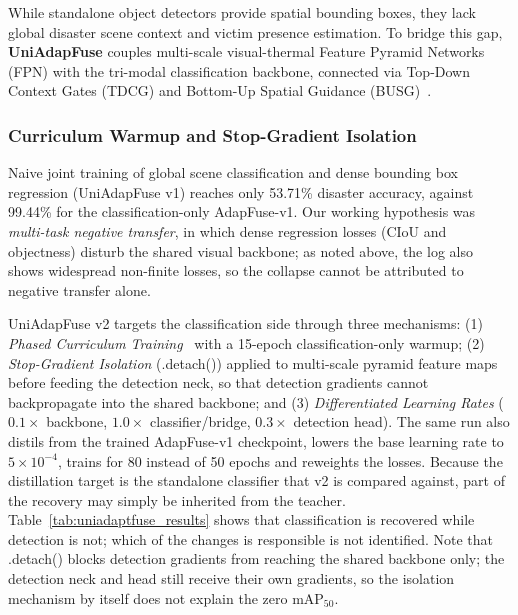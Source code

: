 \documentclass[journal]{IEEEtran}
\begin{document}
While standalone object detectors provide spatial bounding boxes, they lack global disaster scene context and victim presence estimation. To bridge this gap, \textbf{UniAdapFuse} couples multi-scale visual-thermal Feature Pyramid Networks (FPN) with the tri-modal classification backbone, connected via Top-Down Context Gates (TDCG) and Bottom-Up Spatial Guidance (BUSG)~\cite{perez2018film}.

\subsubsection{Curriculum Warmup and Stop-Gradient Isolation}

Naive joint training of global scene classification and dense bounding box regression (UniAdapFuse v1) reaches only 53.71\% disaster accuracy, against 99.44\% for the classification-only AdapFuse-v1. Our working hypothesis was \textit{multi-task negative transfer}, in which dense regression losses (CIoU and objectness) disturb the shared visual backbone; as noted above, the log also shows widespread non-finite losses, so the collapse cannot be attributed to negative transfer alone.

UniAdapFuse v2 targets the classification side through three mechanisms: (1) \textit{Phased Curriculum Training}~\cite{bengio2009curriculum} with a 15-epoch classification-only warmup; (2) \textit{Stop-Gradient Isolation} (.detach()) applied to multi-scale pyramid feature maps before feeding the detection neck, so that detection gradients cannot backpropagate into the shared backbone; and (3) \textit{Differentiated Learning Rates} ($0.1\times$ backbone, $1.0\times$ classifier/bridge, $0.3\times$ detection head). The same run also distils from the trained AdapFuse-v1 checkpoint, lowers the base learning rate to $5\times10^{-4}$, trains for 80 instead of 50 epochs and reweights the losses. Because the distillation target is the standalone classifier that v2 is compared against, part of the recovery may simply be inherited from the teacher. Table~\ref{tab:uniadaptfuse_results} shows that classification is recovered while detection is not; which of the changes is responsible is not identified. Note that .detach() blocks detection gradients from reaching the shared backbone only; the detection neck and head still receive their own gradients, so the isolation mechanism by itself does not explain the zero $\mathrm{mAP}_{50}$.
\end{document}
